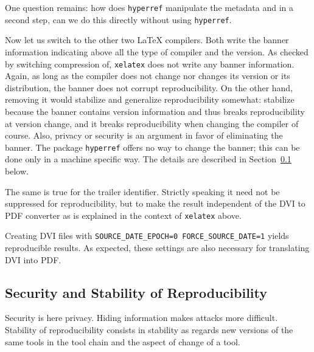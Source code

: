 \documentclass[a4paper, english]{article}%
\newcommand{\xelatex}{\texttt{xelatex}}
\begin{document}
One question remains: how does \texttt{hyperref} manipulate the metadata 
and in a second step, can we do this directly without using \texttt{hyperref}. 
\medskip


Now let us switch to the other two \LaTeX{} compilers. 
Both write the banner information indicating 
above all the type of compiler and the version. 
As checked by switching compression of, \xelatex{} does not write any banner information. 
Again, as long as the compiler does not change nor changes its version or its distribution, 
the banner does not corrupt reproducibility. 
On the other hand, removing it would stabilize and generalize reproducibility somewhat: 
stabilize because the banner contains version information 
and thus breaks reproducibility at version change, 
and it breaks reproducibility when changing the compiler of course. 
Also, privacy or security is an argument in favor of eliminating the banner. 
The package \texttt{hyperref} offers no way to change the banner; 
this can be done only in a machine specific way. 
The details are described in Section~\ref{subsec:securityRep} below. 

The same is true for the trailer identifier. 
Strictly speaking it need not be suppressed for reproducibility, 
but to make the result independent of the DVI to PDF converter 
as is explained in the context of \xelatex{} above. 

Creating DVI files with \texttt{SOURCE\_DATE\_EPOCH=0 FORCE\_SOURCE\_DATE=1} 
yields reproducible results. 
As expected, these settings are also necessary for translating DVI into PDF\@. 



\subsection{Security and Stability of Reproducibility}\label{subsec:securityRep}

Security is here privacy. 
Hiding information makes attacks more difficult. 
Stability of reproducibility consists in stability as regards new versions of the same tools 
in the tool chain and the aspect of change of a tool. 
\end{document}
